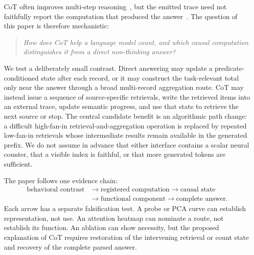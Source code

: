 \documentclass[11pt]{article}
\begin{document}
CoT often improves multi-step reasoning~\citep{wei2022cot}, but the emitted trace need not faithfully report the computation that produced the answer~\citep{turpin2023unfaithful}. The question of this paper is therefore mechanistic:

\begin{quote}
\emph{How does CoT help a language model count, and which causal computation distinguishes it from a direct non-thinking answer?}
\end{quote}

We test a deliberately small contrast. Direct answering may update a
predicate-conditioned state after each record, or it may construct the
task-relevant total only near the answer through a broad multi-record
aggregation route. CoT may instead issue a sequence of source-specific
retrievals, write the retrieved items into an external trace, update semantic
progress, and use that state to retrieve the next source or stop. The central
candidate benefit is an algorithmic path change: a difficult high-fan-in
retrieval-and-aggregation operation is replaced by repeated low-fan-in
retrievals whose intermediate results remain available in the generated
prefix. We do not assume in advance that either interface contains a scalar
neural counter, that a visible index is faithful, or that more generated
tokens are sufficient.

The paper follows one evidence chain:
\begin{equation}
\begin{aligned}
\text{behavioral contrast}
&\longrightarrow
\text{registered computation}
\longrightarrow
\text{causal state}\\[-0.15em]
&\longrightarrow
\text{functional component}
\longrightarrow
\text{complete answer}.
\end{aligned}
\label{eq:evidence-chain}
\end{equation}
Each arrow has a separate falsification test. A probe or PCA curve can establish representation, not use. An attention heatmap can nominate a route, not establish its function. An ablation can show necessity, but the proposed explanation of CoT requires restoration of the intervening retrieval or count state and recovery of the complete parsed answer.
\end{document}

